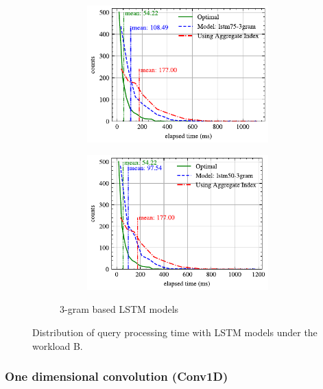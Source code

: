 \documentclass[conference]{IEEEtran}
\begin{document}
\begin{figure}[!th]
\begin{subfigure}{0.45\textwidth}
\begin{subfigure}{\textwidth}
			\includegraphics[]{graphics/perf_dist_lstm75_3gram_B.pdf}
		\end{subfigure}
		\vfill
		\begin{subfigure}{\textwidth}
			\centering
			\includegraphics[]{graphics/perf_dist_lstm50_3gram_B.pdf}
		\end{subfigure}
		\caption{3-gram based LSTM models}
	\end{subfigure}
	\caption{Distribution of query processing time with LSTM models under the workload B.}
	\label{fig:lstm_perf_all_B}
\end{figure}

\subsubsection{One dimensional convolution (Conv1D)}
\end{document}
